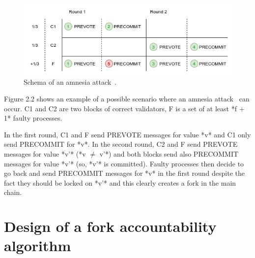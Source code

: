 \documentclass[a4paper,11pt,oneside]{report}
\begin{document}
\begin{figure}[h]
\centering
\includegraphics[scale=0.8]{fork_scenario.png} 
\caption{Schema of an amnesia attack~\cite{amnesia-attack}.}
\label{fig:subim1}
\end{figure}

\begin{markdown}

Figure 2.2 shows an example of a possible scenario where an amnesia attack~\cite{amnesia-attack} can occur.
C1 and C2 are two blocks of correct validators, F is a set of at least *f + 1* faulty processes.

In the first round, C1 and F send PREVOTE messages for value *v* and C1 only send PRECOMMIT for *v*. 
In the second round, C2 and F send PREVOTE messages for value *v'* (*v $\neq$ v'*) 
and both blocks send also PRECOMMIT messages for value *v'* (so, *v'* is committed).
Faulty processes then decide to go back and send PRECOMMIT messages for *v* in the first round despite the fact they should be locked on *v'* and this clearly creates a fork in the main chain.

\end{markdown}

\chapter{Design of a fork accountability algorithm}
\end{document}
